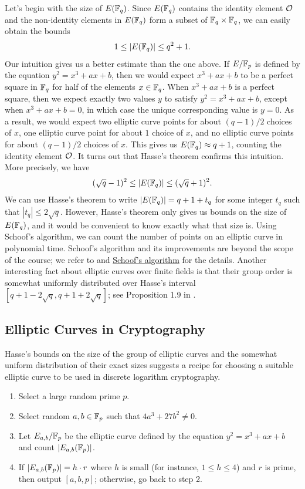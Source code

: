 Let's begin with the size of $E(\mathbb{F}_q)$. Since $E(\mathbb{F}_q)$ contains the 
identity element ${\cal O}$ and the non-identity elements in $E(\mathbb{F}_q)$ 
form a subset of $\mathbb{F}_q \times \mathbb{F}_q$, we can easily obtain the bounds 
\[ 1 \leq |E(\mathbb{F}_q)| \leq q^2 + 1. \] 
Our intuition gives us a better estimate than the one above. If $E/\mathbb{F}_p$ 
is defined by the equation $y^2 = x^3 + ax + b$, then we would expect 
$x^3 + ax + b$ to be a perfect square in $\mathbb{F}_q$ for half of the elements 
$x \in \mathbb{F}_q$. When $x^3 + ax + b$ is a perfect square, then we expect 
exactly two values $y$ to satisfy $y^2 = x^3 + ax + b$, except when 
$x^3 + ax + b = 0$, in which case the unique corresponding value is $y = 0$. 
As a result, we would expect two elliptic curve points for about 
$(q - 1)/2$ choices of $x$, one elliptic curve point for about $1$ choice of $x$,
and no elliptic curve points for about $(q - 1)/2$ choices of $x$. This gives us 
$E(\mathbb{F}_q) \approx q + 1$, counting the identity element ${\cal O}$. It turns 
out that Hasse's theorem confirms this intuition. More precisely, we have 
\[ (\sqrt q - 1)^2 \leq |E(\mathbb{F}_q)| \leq (\sqrt q + 1)^2. \] 
We can use Hasse's theorem to write $|E(\mathbb{F}_q)| = q + 1 + t_q$ for some integer $t_q$ 
such that $|t_q| \leq 2\sqrt{q}$. However, Hasse's theorem only gives us bounds on 
the size of $E(\mathbb{F}_q)$, and it would be convenient to know exactly what that size is. 
Using Schoof's algorithm, we can count the number of points on an elliptic curve in 
polynomial time. Schoof's algorithm and its improvements are beyond the scope of 
the course; we refer to \cite{10.2307/2007968} and 
\href{http://www.mat.uniroma2.it/~schoof/ctpts.pdf}{Schoof's algorithm} for 
the details. Another interesting fact about elliptic curves over finite fields 
is that their group order is somewhat uniformly distributed over Hasse's 
interval $[q + 1 - 2\sqrt{q}, q + 1 + 2\sqrt{q}]$; see Proposition 1.9 in 
\cite{10.2307/1971363}. 

\subsection{Elliptic Curves in Cryptography}
Hasse's bounds on the size of the group of elliptic curves and the somewhat 
uniform distribution of their exact sizes suggests a recipe for choosing a 
suitable elliptic curve to be used in discrete logarithm cryptography. 
\begin{enumerate}
    \item Select a large random prime $p$. 
    \item Select random $a, b \in \mathbb{F}_p$ such that $4a^3 + 27b^2 \neq 0$. 
    \item Let $E_{a,b}/\mathbb{F}_p$ be the elliptic curve defined by the equation 
    $y^2 = x^3 + ax + b$ and count $|E_{a,b}(\mathbb{F}_p)|$. 
    \item If $|E_{a,b}(\mathbb{F}_p)| = h \cdot r$ where $h$ is small (for instance, 
    $1 \leq h \leq 4$) and $r$ is prime, then output $[a, b, p]$; otherwise, 
    go back to step 2. 
\end{enumerate}

